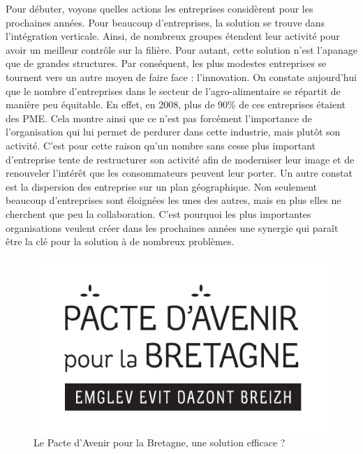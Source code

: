 \documentclass[a4paper,12pt]{report}
\begin{document}
			Pour débuter, voyons quelles actions les entreprises considèrent pour les prochaines années. Pour beaucoup d’entreprises, la solution se trouve dans l’intégration verticale. Ainsi, de nombreux groupes étendent leur activité pour avoir un meilleur contrôle sur la filière. Pour autant, cette solution n’est l’apanage que de grandes structures. Par conséquent, les plus modestes entreprises se tournent vers un autre moyen de faire face : l’innovation. On constate aujourd’hui que le nombre d’entreprises dans le secteur de l’agro-alimentaire se répartit de manière peu équitable. En effet, en 2008, plus de 90\% de ces entreprises étaient des PME\cite{IAAFranceChiffres}. Cela montre ainsi que ce n’est pas forcément l’importance de l’organisation qui lui permet de perdurer dans cette industrie, mais plutôt son activité. C’est pour cette raison qu’un nombre sans cesse plus important d’entreprise tente de restructurer son activité afin de moderniser leur image et de renouveler l’intérêt que les consommateurs peuvent leur porter. Un autre constat est la dispersion des entreprise sur un plan géographique. Non seulement beaucoup d’entreprises sont éloignées les unes des autres, mais en plus elles ne cherchent que peu la collaboration. C’est pourquoi les plus importantes organisations veulent créer dans les prochaines années une synergie qui paraît être la clé pour la solution à de nombreux problèmes.
			
			\begin{figure}[!h]
			\centering
			\includegraphics[scale=1]{Illustrations/Pacte_Avenir_Bretagne.png}
			\caption{Le Pacte d'Avenir pour la Bretagne, une solution efficace ?}
			\label{PacteAvenirPourBretagne}			
			\end{figure}
			
\end{document}
